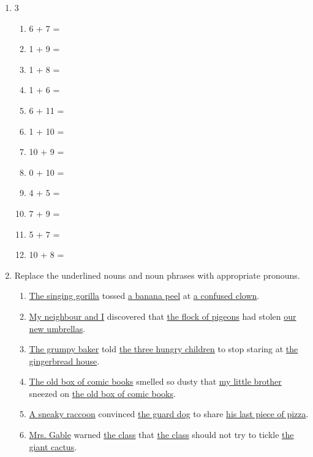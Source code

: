\documentclass{tufte-book}
\begin{document}
\begin{enumerate}
\item
  \begin{multicols}{3}

    \begin{enumerate}\bigskip
      \item 6 + 7 = \dotfill\bigskip
      \item 1 + 9 = \dotfill\bigskip
      \item 1 + 8 = \dotfill\bigskip
      \item 1 + 6 = \dotfill
      \item 6 + 11 = \dotfill\bigskip
      \item 1 + 10 = \dotfill\bigskip
      \item 10 + 9 = \dotfill\bigskip
      \item 0 + 10 = \dotfill
      \item 4 + 5 = \dotfill\bigskip
      \item 7 + 9 = \dotfill\bigskip
      \item 5 + 7 = \dotfill\bigskip
      \item 10 + 8 = \dotfill
    \end{enumerate}
  \end{multicols}

  \item Replace the underlined nouns and noun phrases with appropriate pronouns.

  \begin{enumerate}
      \item \underline{The singing gorilla} tossed \underline{a banana peel} at \underline{a confused clown}.\bigskip
      \item \underline{My neighbour and I} discovered that \underline{the flock of pigeons} had stolen \underline{our new umbrellas}.\bigskip
      \item \underline{The grumpy baker} told \underline{the three hungry children} to stop staring at \underline{the gingerbread house}.\bigskip
      \item \underline{The old box of comic books} smelled so dusty that \underline{my little brother} sneezed on \underline{the old box of comic books}.\bigskip
      \item \underline{A sneaky raccoon} convinced \underline{the guard dog} to share \underline{his last piece of pizza}.\bigskip
      \item \underline{Mrs. Gable} warned \underline{the class} that \underline{the class} should not try to tickle \underline{the giant cactus}.\bigskip
  \end{enumerate}


\end{enumerate}
\end{document}

